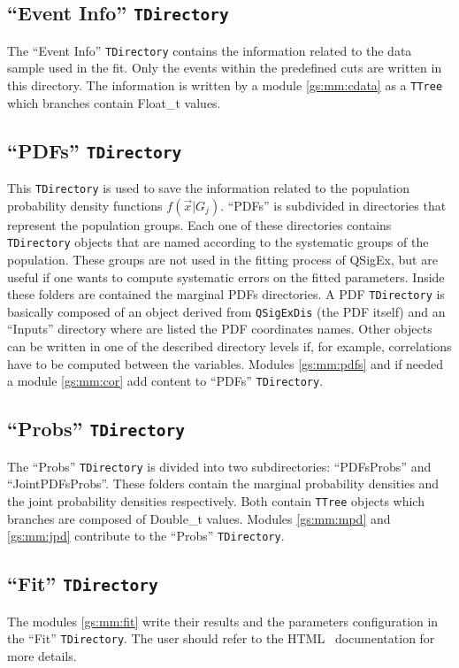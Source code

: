 \subsection{``Event Info'' \texttt{TDirectory}}
The ``Event Info'' \texttt{TDirectory} contains the information related to the data sample used in the fit.
Only the events within the predefined cuts are written in this directory.
The information is written by a module \ref{gs:mm:cdata} as a \texttt{TTree} which branches contain Float{\_}t values. 

\subsection{``PDFs'' \texttt{TDirectory}}
This \texttt{TDirectory} is used to save the information related to the population probability density functions $f(\vec{x}|G_j)$.
``PDFs'' is subdivided in directories that represent the population groups.
Each one of these directories contains \texttt{TDirectory} objects that are named according to the systematic groups of the population.
These groups are not used in the fitting process of QSigEx, but are useful if one wants to compute systematic errors on the fitted parameters.
Inside these folders are contained the marginal PDFs
directories.
A PDF \texttt{TDirectory} is basically composed of an object derived from \texttt{QSigExDis} (the PDF itself) and an ``Inputs'' directory where are listed the PDF coordinates names.
Other objects can be written in one of the described directory levels if, for example, correlations have to be computed between the variables.
Modules \ref{gs:mm:pdfs} and if needed a module \ref{gs:mm:cor} add content to ``PDFs'' \texttt{TDirectory}. 

\subsection{``Probs'' \texttt{TDirectory}}
The ``Probs'' \texttt{TDirectory} is divided into two subdirectories: ``PDFsProbs'' and ``JointPDFsProbs''.
These folders contain the marginal probability densities and the joint probability densities respectively.
Both contain \texttt{TTree} objects which branches are composed of Double{\_}t values.
Modules \ref{gs:mm:mpd} and \ref{gs:mm:jpd} contribute to the ``Probs'' \texttt{T\-Di\-rec\-to\-ry}. 

\subsection{``Fit'' \texttt{TDirectory}}
The modules \ref{gs:mm:fit} write their results and the parameters configuration in the ``Fit'' \texttt{TDirectory}.
The user should refer to the HTML~\cite{QSigEx:HTML} documentation for more details. 
